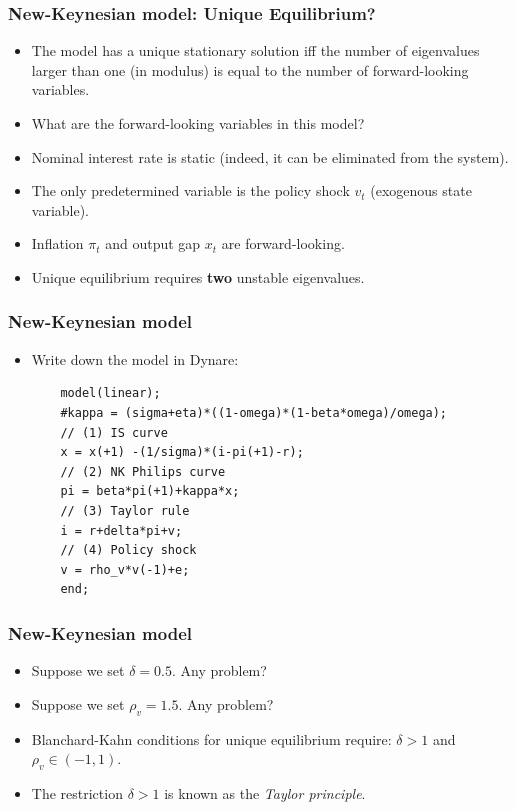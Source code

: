 \documentclass{beamer}
\begin{document}
\begin{frame}
\frametitle{New-Keynesian model: Unique Equilibrium?}

\begin{itemize}
	\item The model has a unique stationary solution iff the number of eigenvalues larger than one (in modulus) is equal to the number of forward-looking variables.
	\item What are the forward-looking variables in this model?
	\pause 
	\item Nominal interest rate is static (indeed, it can be eliminated from the system).
	\item The only predetermined variable is the policy shock $ v_{t} $ (exogenous state variable).
	\pause
	\item Inflation $ \pi_{t} $ and output gap $ x_{t} $ are forward-looking.
	
	\item Unique equilibrium requires \textbf{two} unstable eigenvalues.
	
\end{itemize}

\end{frame}

\begin{frame}[fragile]
\frametitle{New-Keynesian model}

\begin{itemize}
	\item Write down the model in Dynare:
	\begin{verbatim}
	model(linear); 
	#kappa = (sigma+eta)*((1-omega)*(1-beta*omega)/omega);
	// (1) IS curve
	x = x(+1) -(1/sigma)*(i-pi(+1)-r);
	// (2) NK Philips curve
	pi = beta*pi(+1)+kappa*x;
	// (3) Taylor rule
	i = r+delta*pi+v;
	// (4) Policy shock
	v = rho_v*v(-1)+e;
	end;
	\end{verbatim}
\end{itemize}

\end{frame}

\begin{frame}[fragile]
\frametitle{New-Keynesian model}

\begin{itemize}
	\item Suppose we set $ \delta = 0.5$. Any problem?
	\pause
	\item Suppose we set $ \rho_{v} = 1.5$. Any problem?
	\pause 
	\item Blanchard-Kahn conditions for unique equilibrium require: $ \delta>1$ and $ \rho_{v}\in(-1,1)$. 
	\item The restriction $ \delta>1$ is known as the \textit{Taylor principle}.
\end{itemize}

\end{frame}
\end{document}
